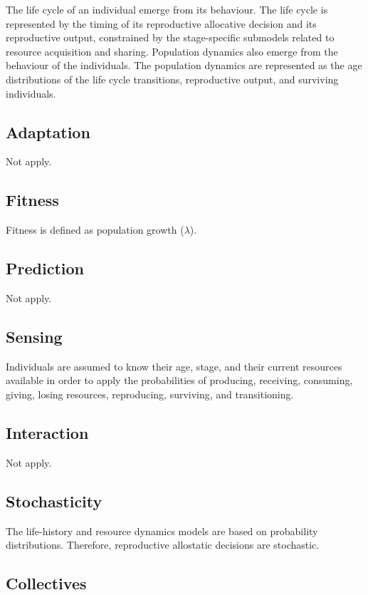 \documentclass{article}
\begin{document}
 The life cycle of an individual emerge from its behaviour. The life cycle is represented by the timing of its reproductive allocative decision and its reproductive output, constrained by the stage-specific submodels related to resource acquisition and sharing. Population dynamics also emerge from the behaviour of the individuals. The population dynamics are represented as the age distributions of the life cycle transitions, reproductive output, and surviving individuals. 

\subsection{Adaptation}

Not apply.

\subsection{Fitness}

Fitness is defined as population growth ($\lambda$).

\subsection{Prediction}

Not apply.

\subsection{Sensing}

Individuals are assumed to know their age, stage, and their current resources available  in order to apply the probabilities of producing, receiving, consuming, giving, losing resources, reproducing, surviving, and transitioning.

\subsection{Interaction}

Not apply.

\subsection{Stochasticity}

The life-history and resource dynamics models are based on probability distributions. Therefore, reproductive allostatic decisions are stochastic.

\subsection{Collectives}
\end{document}
